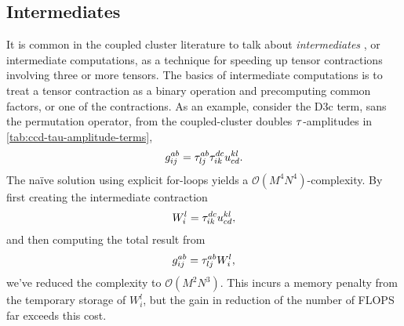         \subsection{Intermediates}
            It is common in the coupled cluster literature to talk about
            \emph{intermediates} \cite{gauss1995coupled, hjorth2017advanced}, or
            intermediate computations, as a technique for speeding up tensor
            contractions involving three or more tensors.
            The basics of intermediate computations is to treat a tensor
            contraction as a binary operation and precomputing common factors,
            or one of the contractions.
            As an example, consider the D3c term, sans the permutation operator,
            from the coupled-cluster doubles $\tau$-amplitudes in
            \autoref{tab:ccd-tau-amplitude-terms},
            \begin{align}
                g^{ab}_{ij} = \tau^{ab}_{lj} \tau^{dc}_{ik}
                u^{kl}_{cd}.
            \end{align}
            The naïve solution using explicit for-loops yields a
            $\mathcal{O}(M^4 N^4)$-complexity.
            By first creating the intermediate contraction
            \begin{align}
                W^{l}_{i} = \tau^{dc}_{ik} u^{kl}_{cd},
                \label{eq:w_li}
            \end{align}
            and then computing the total result from
            \begin{align}
                g^{ab}_{ij} = \tau^{ab}_{lj} W^{l}_{i},
            \end{align}
            we've reduced the complexity to $\mathcal{O}(M^2 N^3)$.
            This incurs a memory penalty from the temporary storage of
            $W^{l}_{i}$, but the gain in reduction of the number of FLOPS far
            exceeds this cost.

